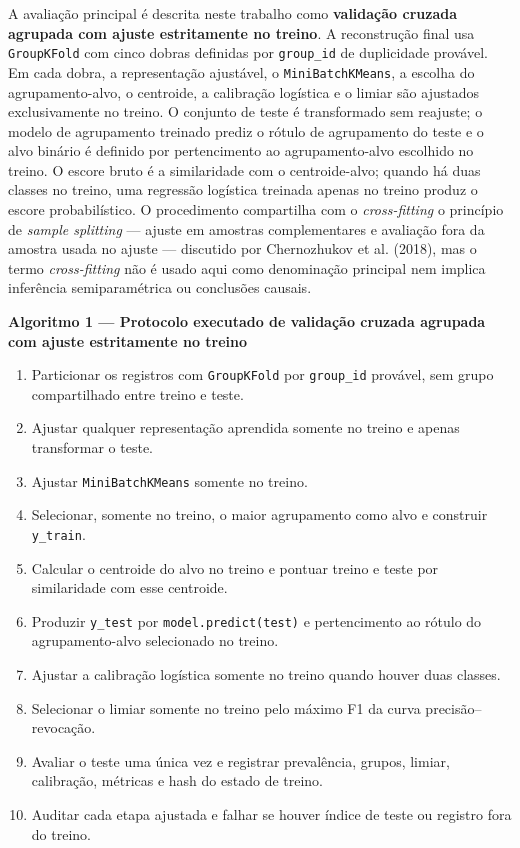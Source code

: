 A avaliação principal é descrita neste trabalho como \textbf{validação cruzada agrupada com ajuste estritamente no treino}. A reconstrução final usa \texttt{GroupKFold} com cinco dobras definidas por \texttt{group\_id} de duplicidade provável. Em cada dobra, a representação ajustável, o \texttt{MiniBatchKMeans}, a escolha do agrupamento-alvo, o centroide, a calibração logística e o limiar são ajustados exclusivamente no treino. O conjunto de teste é transformado sem reajuste; o modelo de agrupamento treinado prediz o rótulo de agrupamento do teste e o alvo binário é definido por pertencimento ao agrupamento-alvo escolhido no treino. O escore bruto é a similaridade com o centroide-alvo; quando há duas classes no treino, uma regressão logística treinada apenas no treino produz o escore probabilístico. O procedimento compartilha com o \emph{cross-fitting} o princípio de \emph{sample splitting} --- ajuste em amostras complementares e avaliação fora da amostra usada no ajuste --- discutido por Chernozhukov et al. (2018), mas o termo \emph{cross-fitting} não é usado aqui como denominação principal nem implica inferência semiparamétrica ou conclusões causais.

\begin{boxtext}
\textbf{Algoritmo 1 --- Protocolo executado de validação cruzada agrupada com ajuste estritamente no treino}\par
\begin{enumerate}
\setlength{\itemsep}{1pt}
\setlength{\parskip}{0pt}
\setlength{\parsep}{0pt}
\item Particionar os registros com \texttt{GroupKFold} por \texttt{group\_id} provável, sem grupo compartilhado entre treino e teste.
\item Ajustar qualquer representação aprendida somente no treino e apenas transformar o teste.
\item Ajustar \texttt{MiniBatchKMeans} somente no treino.
\item Selecionar, somente no treino, o maior agrupamento como alvo e construir \texttt{y\_train}.
\item Calcular o centroide do alvo no treino e pontuar treino e teste por similaridade com esse centroide.
\item Produzir \texttt{y\_test} por \texttt{model.predict(test)} e pertencimento ao rótulo do agrupamento-alvo selecionado no treino.
\item Ajustar a calibração logística somente no treino quando houver duas classes.
\item Selecionar o limiar somente no treino pelo máximo F1 da curva precisão--revocação.
\item Avaliar o teste uma única vez e registrar prevalência, grupos, limiar, calibração, métricas e hash do estado de treino.
\item Auditar cada etapa ajustada e falhar se houver índice de teste ou registro fora do treino.
\end{enumerate}
\end{boxtext}

